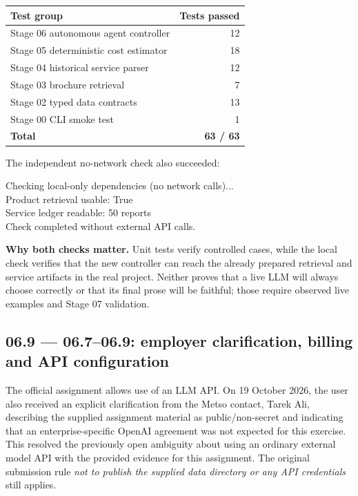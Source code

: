 \documentclass[11pt,a4paper]{article}
\begin{document}
\begin{tabularx}{\textwidth}{@{}Y r@{}}
\toprule
\textbf{Test group} & \textbf{Tests passed}\\\midrule
Stage 06 autonomous agent controller & 12\\
Stage 05 deterministic cost estimator & 18\\
Stage 04 historical service parser & 12\\
Stage 03 brochure retrieval & 7\\
Stage 02 typed data contracts & 13\\
Stage 00 CLI smoke test & 1\\\midrule
\textbf{Total} & \textbf{63 / 63}\\\bottomrule
\end{tabularx}

The independent no-network check also succeeded:
\begin{examplebox}
\footnotesize\ttfamily
Checking local-only dependencies (no network calls)...\\
Product retrieval usable: True\\
Service ledger readable: 50 reports\\
Check completed without external API calls.
\end{examplebox}

\textbf{Why both checks matter.} Unit tests verify controlled cases, while the local check verifies that the new controller can reach the already prepared retrieval and service artifacts in the real project. Neither proves that a live LLM will always choose correctly or that its final prose will be faithful; those require observed live examples and Stage 07 validation.

\subsection{06.9 --- 06.7--06.9: employer clarification, billing and API configuration}
The official assignment allows use of an LLM API. On 19 October 2026, the user also received an explicit clarification from the Metso contact, Tarek Ali, describing the supplied assignment material as public/non-secret and indicating that an enterprise-specific OpenAI agreement was not expected for this exercise. This resolved the previously open ambiguity about using an ordinary external model API with the provided evidence for this assignment. The original submission rule \emph{not to publish the supplied data directory or any API credentials} still applies.
\end{document}
